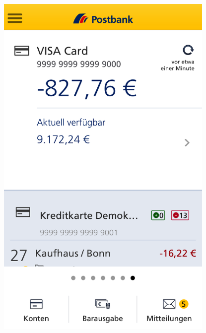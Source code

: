 \begin{figure}[H] 
    \begin{minipage}[b]{.5\linewidth}
        \centering\includegraphics[width=0.94\textwidth]{img/screenshots/ex3p7.png}
    \end{minipage}%
    \begin{minipage}[b]{.5\linewidth}

\end{minipage}
\end{figure}
